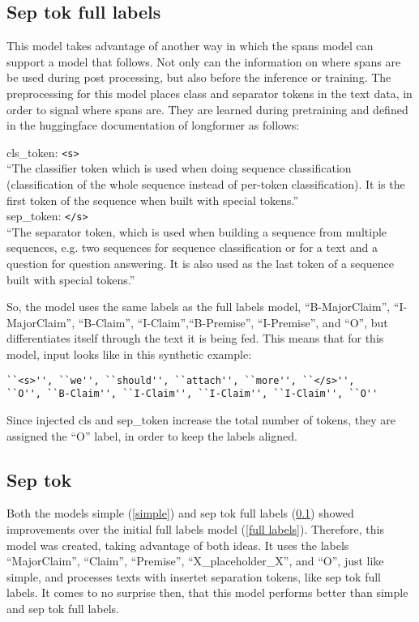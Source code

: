 \documentclass[12]{article}
\theoremstyle{mytheoremstyle}
\theoremstyle{mytheoremstyle}
\theoremstyle{myproblemstyle}
\begin{document}
  \subsection{Sep tok full labels} \label{sep tok full labels}
  This model takes advantage of another way in which the spans model can support a model that follows. Not only can the information on where spans are be used during post processing, but also before the inference or training. The preprocessing for this model places class and separator tokens in the text data, in order to signal where spans are. They are learned during pretraining and defined in the huggingface documentation of longformer as follows:
  \vspace{1ex}
  \begin{adjustwidth}{0.5cm}{0.5cm}
  cls\_token: \verb|<s>|\\
    ``The classifier token which is used when doing sequence classification (classification of the whole sequence instead of per-token classification). It is the first token of the sequence when built with special tokens.'' \cite{LongformerTokenizer} \vspace{1ex}\\
  sep\_token: \verb|</s>|\\
  ``The separator token, which is used when building a sequence from multiple sequences, e.g. two sequences for sequence classification or for a text and a question for question answering. It is also used as the last token of a sequence built with special tokens.'' \cite{LongformerTokenizer}\vspace{-2ex}\\
  \end{adjustwidth}
  So, the model uses the same labels as the full labels model, ``B-MajorClaim'', ``I-MajorClaim'', ``B-Claim'', ``I-Claim'',``B-Premise'', ``I-Premise'', and ``O'', but differentiates itself through the text it is being fed. This means that for this model, input looks like in this synthetic example:
  \begin{verbatim}
``<s>'', ``we'', ``should'', ``attach'', ``more'', ``</s>'', 
``O'', ``B-Claim'', ``I-Claim'', ``I-Claim'', ``I-Claim'', ``O''
  \end{verbatim}
  \vspace{-3.5ex}
  Since injected cls and sep\_token increase the total number of tokens, they are assigned the ``O'' label, in order to keep the labels aligned.
  \subsection{Sep tok} \label{sep tok}
  Both the models simple (\ref{simple}) and sep tok full labels (\ref{sep tok full labels}) showed improvements over the initial full labels model (\ref{full labels}). Therefore, this model was created, taking advantage of both ideas. It uses the labels ``MajorClaim'', ``Claim'', ``Premise'', ``X\_placeholder\_X'', and ``O'', just like simple, and processes texts with insertet separation tokens, like sep tok full labels. It comes to no surprise then, that this model performs better than simple and sep tok full labels.
\end{document}
